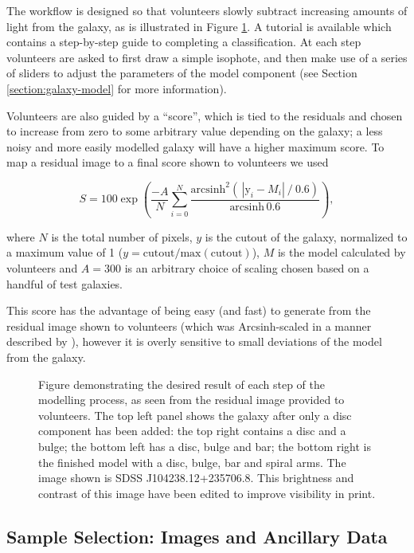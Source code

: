 \documentclass[main\.tex]{subfiles}
\begin{document}
The workflow is designed so that volunteers slowly subtract increasing amounts of light from the galaxy, as is illustrated in Figure \ref{fig:residualsStepByStep}. A tutorial is available which contains a step-by-step guide to completing a classification. At each step volunteers are asked to first draw a simple isophote, and then make use of a series of sliders to adjust the parameters of the model component (see Section \ref{section:galaxy-model} for more information).

Volunteers are also guided by a ``score'', which is tied to the residuals and chosen to increase from zero to some arbitrary value depending on the galaxy; a less noisy and more easily modelled galaxy will have a higher maximum score. To map a residual image to a final score shown to volunteers we used

\begin{equation}
  \label{eqn:gal_score}
    S = 100 \exp\left(\frac{-A}{N}\sum_{i=0}^N\frac{\text{arcsinh}^2\left(\,|\text{y}_i - M_i|\ /\ 0.6\right)}{\text{arcsinh}\,0.6 }\right),
\end{equation}

where $N$ is the total number of pixels, $y$ is the cutout of the galaxy, normalized to a maximum value of 1 ($y = \text{cutout}/\text{max}(\text{cutout})$), $M$ is the model calculated by volunteers and $A=300$ is an arbitrary choice of scaling chosen based on a handful of test galaxies.

This score has the advantage of being easy (and fast) to generate from the residual image shown to volunteers (which was Arcsinh-scaled in a manner described by \citealt{Lupton2003:astro-ph/0312483v1}), however it is overly sensitive to small deviations of the model from the galaxy.

\begin{figure}
  \caption{Figure demonstrating the desired result of each step of the modelling process, as seen from the residual image provided to volunteers. The top left panel shows the galaxy after only a disc component has been added: the top right contains a disc and a bulge; the bottom left has a disc, bulge and bar; the bottom right is the finished model with a disc, bulge, bar and spiral arms. The image shown is SDSS J104238.12+235706.8. This brightness and contrast of this image have been edited to improve visibility in print.}
  \label{fig:residualsStepByStep}
\end{figure}


\subsection{Sample Selection: Images and Ancillary Data}
\label{sec:data}
\end{document}
